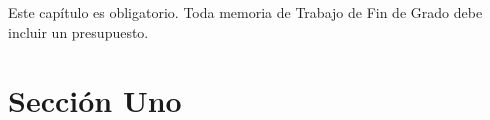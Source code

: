 

Este capítulo es obligatorio.
Toda memoria de Trabajo de Fin de Grado debe incluir un presupuesto.

\section{Sección Uno}
\label{8:sec:1}





